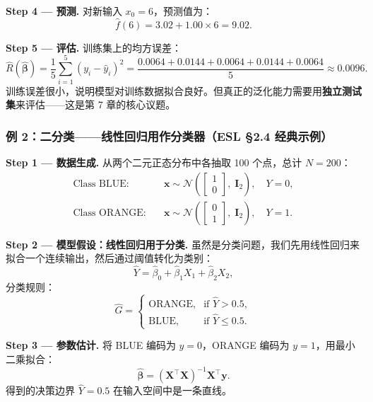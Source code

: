 \textbf{Step 4 --- 预测.}
对新输入 $x_0 = 6$，预测值为：
\[
\hat{f}(6) = 3.02 + 1.00 \times 6 = 9.02.
\]

\textbf{Step 5 --- 评估.}
训练集上的均方误差：
\[
\widehat{R}(\hat{\bm{\beta}}) = \frac{1}{5}\sum_{i=1}^{5} (y_i - \hat{y}_i)^2
= \frac{0.0064 + 0.0144 + 0.0064 + 0.0144 + 0.0064}{5} \approx 0.0096.
\]
训练误差很小，说明模型对训练数据拟合良好。但真正的泛化能力需要用\textbf{独立测试集}来评估——这是第 7 章的核心议题。

\subsubsection{例 2：二分类——线性回归用作分类器（ESL \S 2.4 经典示例）}

\textbf{Step 1 --- 数据生成.}
从两个二元正态分布中各抽取 100 个点，总计 $N = 200$：
\begin{align}
    \text{Class BLUE:}\quad & \mathbf{x} \sim \mathcal{N}\!\left(\begin{bmatrix} 1 \\ 0 \end{bmatrix},\; \mathbf{I}_2\right), \quad Y = 0,\\[4pt]
    \text{Class ORANGE:}\quad & \mathbf{x} \sim \mathcal{N}\!\left(\begin{bmatrix} 0 \\ 1 \end{bmatrix},\; \mathbf{I}_2\right), \quad Y = 1.
\end{align}

\textbf{Step 2 --- 模型假设：线性回归用于分类.}
虽然是分类问题，我们先用线性回归来拟合一个连续输出，然后通过阈值转化为类别：
\begin{equation}\label{eq:ex_linclass}
    \hat{Y} = \hat{\beta}_0 + \hat{\beta}_1 X_1 + \hat{\beta}_2 X_2,
\end{equation}
分类规则：
\begin{equation}\label{eq:ex_class_rule}
    \hat{G} = \begin{cases}
        \text{ORANGE}, & \text{if } \hat{Y} > 0.5,\\
        \text{BLUE},   & \text{if } \hat{Y} \le 0.5.
    \end{cases}
\end{equation}

\textbf{Step 3 --- 参数估计.}
将 BLUE 编码为 $y = 0$，ORANGE 编码为 $y = 1$，用最小二乘拟合：
\[
\hat{\bm{\beta}} = (\mathbf{X}^\top \mathbf{X})^{-1} \mathbf{X}^\top \mathbf{y}.
\]
得到的决策边界 $\hat{Y} = 0.5$ 在输入空间中是一条直线。

